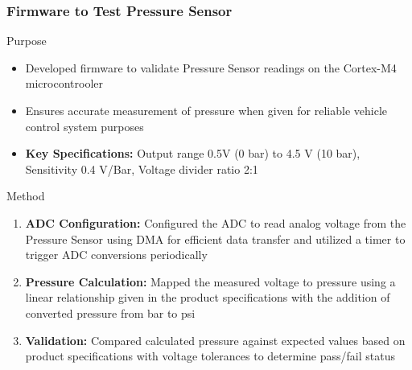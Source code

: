 \documentclass[8pt,compress,aspectratio=169]{beamer}
\newcommand\LightBold[1]{\textcolor{VSBlueLight}{\textbf{#1}}}
\begin{document}
\begin{frame}
    \frametitle{Firmware to Test Pressure Sensor}
    \begin{block}{Purpose}
        \small{
            \begin{itemize}
                \item Developed firmware to validate Pressure Sensor readings on the Cortex-M4 microcontrooler
                \item Ensures accurate measurement of pressure when given for reliable vehicle control system purposes
                \item \LightBold{Key Specifications:} Output range 0.5V (0 bar) to 4.5 V (10 bar), Sensitivity 0.4 V/Bar, Voltage divider ratio 2:1
            \end{itemize}
        }
    \end{block}
    \hspace{-0.5cm}
    \begin{minipage}{0.485\textwidth}
        \begin{block}{Method}
            \small{
                \begin{enumerate}
                    \tiny
                    \item \LightBold{ADC Configuration:} Configured the ADC to read analog voltage from the Pressure Sensor using DMA for efficient data transfer and utilized a timer to trigger ADC conversions periodically
                    \item \LightBold{Pressure Calculation:} Mapped the measured voltage to pressure using a linear relationship given in the product specifications with the addition of converted pressure from bar to psi
                    \item \LightBold{Validation:} Compared calculated pressure against expected values based on product specifications with voltage tolerances to determine pass/fail status

\end{enumerate}}
\end{block}
\end{minipage}
\end{frame}
\end{document}
